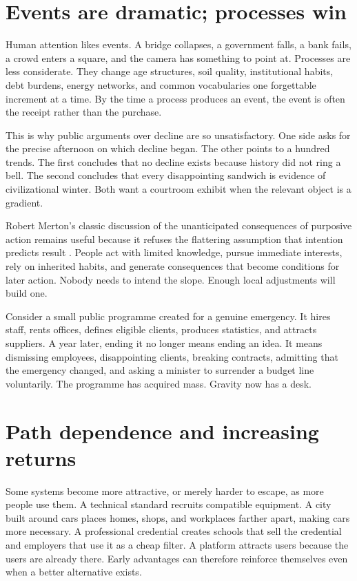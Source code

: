 \documentclass[12pt,a4paper]{book}
\begin{document}
\section{Events are dramatic; processes win}

Human attention likes events.  A bridge collapses, a government falls, a bank
fails, a crowd enters a square, and the camera has something to point at.
Processes are less considerate.  They change age structures, soil quality,
institutional habits, debt burdens, energy networks, and common vocabularies
one forgettable increment at a time.  By the time a process produces an event,
the event is often the receipt rather than the purchase.

This is why public arguments over decline are so unsatisfactory.  One side
asks for the precise afternoon on which decline began.  The other points to a
hundred trends.  The first concludes that no decline exists because history
did not ring a bell.  The second concludes that every disappointing sandwich
is evidence of civilizational winter.  Both want a courtroom exhibit when the
relevant object is a gradient.

Robert Merton's classic discussion of the unanticipated consequences of
purposive action remains useful because it refuses the flattering assumption
that intention predicts result \cite{MertonUnanticipated1936}.  People act
with limited knowledge, pursue immediate interests, rely on inherited habits,
and generate consequences that become conditions for later action.  Nobody
needs to intend the slope.  Enough local adjustments will build one.

Consider a small public programme created for a genuine emergency.  It hires
staff, rents offices, defines eligible clients, produces statistics, and
attracts suppliers.  A year later, ending it no longer means ending an idea.
It means dismissing employees, disappointing clients, breaking contracts,
admitting that the emergency changed, and asking a minister to surrender a
budget line voluntarily.  The programme has acquired mass.  Gravity now has a
desk.

\section{Path dependence and increasing returns}

Some systems become more attractive, or merely harder to escape, as more
people use them.  A technical standard recruits compatible equipment.  A city
built around cars places homes, shops, and workplaces farther apart, making
cars more necessary.  A professional credential creates schools that sell the
credential and employers that use it as a cheap filter.  A platform attracts
users because the users are already there.  Early advantages can therefore
reinforce themselves even when a better alternative exists.
\end{document}

